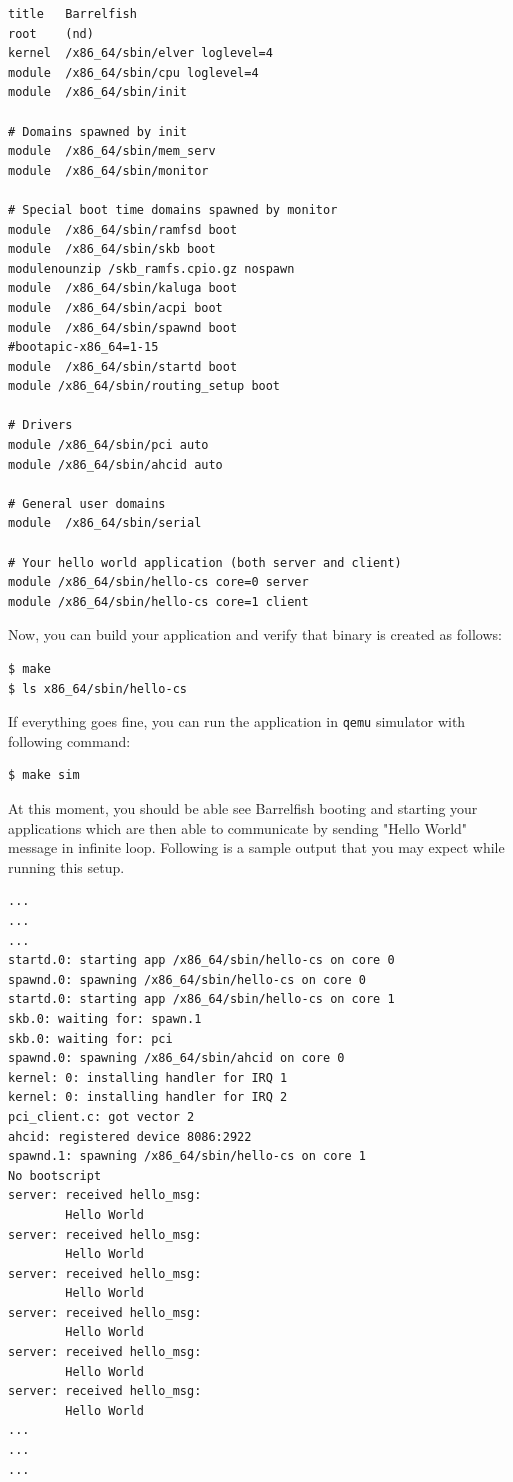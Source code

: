 \begin{verbatim}
title	Barrelfish
root	(nd)
kernel	/x86_64/sbin/elver loglevel=4
module	/x86_64/sbin/cpu loglevel=4
module	/x86_64/sbin/init

# Domains spawned by init
module	/x86_64/sbin/mem_serv
module	/x86_64/sbin/monitor

# Special boot time domains spawned by monitor
module  /x86_64/sbin/ramfsd boot
module  /x86_64/sbin/skb boot
modulenounzip /skb_ramfs.cpio.gz nospawn
module  /x86_64/sbin/kaluga boot
module  /x86_64/sbin/acpi boot
module  /x86_64/sbin/spawnd boot
#bootapic-x86_64=1-15
module  /x86_64/sbin/startd boot
module /x86_64/sbin/routing_setup boot

# Drivers
module /x86_64/sbin/pci auto
module /x86_64/sbin/ahcid auto

# General user domains
module	/x86_64/sbin/serial

# Your hello world application (both server and client)
module /x86_64/sbin/hello-cs core=0 server
module /x86_64/sbin/hello-cs core=1 client
\end{verbatim}

Now, you can build your application and verify that binary is created as
follows:

\begin{verbatim}
$ make
$ ls x86_64/sbin/hello-cs
\end{verbatim}

If everything goes fine, you can run the application in \texttt{qemu} simulator
with following command:
\begin{verbatim}
$ make sim
\end{verbatim}

At this moment, you should be able see Barrelfish booting and starting your
applications which are then able to communicate by sending "Hello World"
message in infinite loop.  Following is a sample output that you may expect
while running this setup.

\begin{verbatim}
...
...
...
startd.0: starting app /x86_64/sbin/hello-cs on core 0
spawnd.0: spawning /x86_64/sbin/hello-cs on core 0
startd.0: starting app /x86_64/sbin/hello-cs on core 1
skb.0: waiting for: spawn.1
skb.0: waiting for: pci
spawnd.0: spawning /x86_64/sbin/ahcid on core 0
kernel: 0: installing handler for IRQ 1
kernel: 0: installing handler for IRQ 2
pci_client.c: got vector 2
ahcid: registered device 8086:2922
spawnd.1: spawning /x86_64/sbin/hello-cs on core 1
No bootscript
server: received hello_msg:
        Hello World
server: received hello_msg:
        Hello World
server: received hello_msg:
        Hello World
server: received hello_msg:
        Hello World
server: received hello_msg:
        Hello World
server: received hello_msg:
        Hello World
...
...
...
\end{verbatim}


